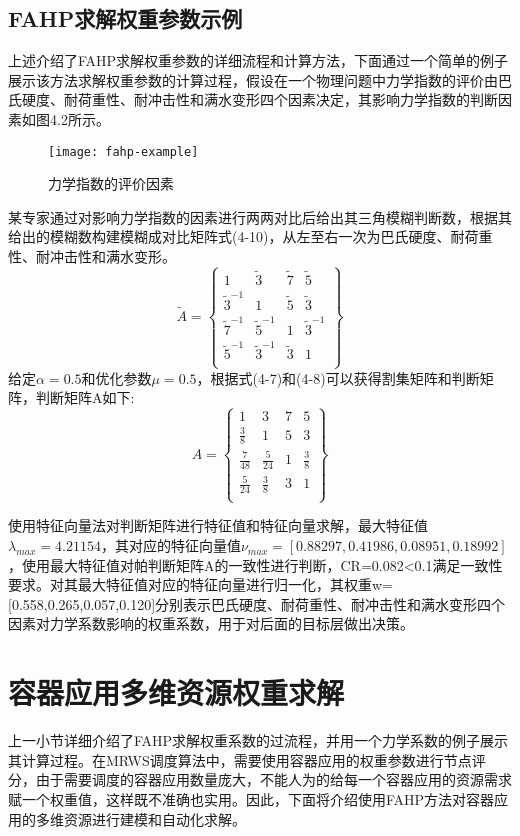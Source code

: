 \subsection{FAHP求解权重参数示例}
上述介绍了FAHP求解权重参数的详细流程和计算方法，下面通过一个简单的例子展示该方法求解权重参数的计算过程，假设在一个物理问题中力学指数的评价由巴氏硬度、耐荷重性、耐冲击性和满水变形四个因素决定，其影响力学指数的判断因素如图4.2所示。
\begin{figure}[H] %
	\centering
	\texttt{[image: fahp-example]}
	\caption{力学指数的评价因素}
\end{figure}
某专家通过对影响力学指数的因素进行两两对比后给出其三角模糊判断数，根据其给出的模糊数构建模糊成对比矩阵式(4-10)，从左至右一次为巴氏硬度、耐荷重性、耐冲击性和满水变形。
\begin{equation}
\widetilde{A} = \left\{\begin{array}{cccc}
1 & \widetilde{3} & \widetilde{7} & \widetilde{5}  \\
\widetilde{3}^{-1} & 1 & \widetilde{5} & \widetilde{3} \\
\widetilde{7}^{-1} & \widetilde{5}^{-1} & 1 & \widetilde{3}^{-1} \\
\widetilde{5}^{-1} & \widetilde{3}^{-1} & \widetilde{3} & 1 \\
\end{array}\right\}
\end{equation}
给定$\alpha=0.5$和优化参数$\mu=0.5$，根据式(4-7)和(4-8)可以获得割集矩阵和判断矩阵，判断矩阵A如下:
\begin{equation}
A = \left\{\begin{array}{cccc}
1 & 3 & 7 & 5 \\
\frac{3}{8} & 1 & 5 & 3 \\
\frac{7}{48} & \frac{5}{24} & 1 & \frac{3}{8} \\
\frac{5}{24} & \frac{3}{8} & 3 & 1 \\
\end{array}\right\}
\end{equation}

使用特征向量法对判断矩阵进行特征值和特征向量求解，最大特征值$\lambda_{max}=4.21154$，其对应的特征向量值$\nu_{max}=[0.88297,0.41986,0.08951,0.18992]$，使用最大特征值对帕判断矩阵A的一致性进行判断，CR=0.082<0.1满足一致性要求。对其最大特征值对应的特征向量进行归一化，其权重w=[0.558,0.265,0.057,0.120]分别表示巴氏硬度、耐荷重性、耐冲击性和满水变形四个因素对力学系数影响的权重系数，用于对后面的目标层做出决策。

\section{容器应用多维资源权重求解}
上一小节详细介绍了FAHP求解权重系数的过流程，并用一个力学系数的例子展示其计算过程。在MRWS调度算法中，需要使用容器应用的权重参数进行节点评分，由于需要调度的容器应用数量庞大，不能人为的给每一个容器应用的资源需求赋一个权重值，这样既不准确也实用。因此，下面将介绍使用FAHP方法对容器应用的多维资源进行建模和自动化求解。
